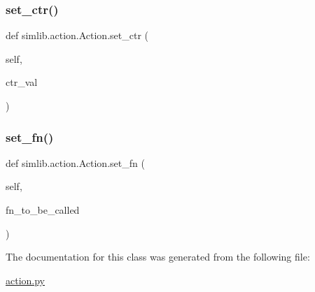 \subsubsection{\texorpdfstring{set\+\_\+ctr()}{set\_ctr()}}
{\footnotesize\ttfamily def simlib.\+action.\+Action.\+set\+\_\+ctr (\begin{DoxyParamCaption}\item[{}]{self,  }\item[{}]{ctr\+\_\+val }\end{DoxyParamCaption})}

\mbox{\label{classsimlib_1_1action_1_1_action_a7208f5d6452283fe610143e5b0786f2b}} 
\subsubsection{\texorpdfstring{set\+\_\+fn()}{set\_fn()}}
{\footnotesize\ttfamily def simlib.\+action.\+Action.\+set\+\_\+fn (\begin{DoxyParamCaption}\item[{}]{self,  }\item[{}]{fn\+\_\+to\+\_\+be\+\_\+called }\end{DoxyParamCaption})}



The documentation for this class was generated from the following file\+:\begin{DoxyCompactItemize}
\item 
\mbox{\hyperlink{action_8py}{action.\+py}}\end{DoxyCompactItemize}
